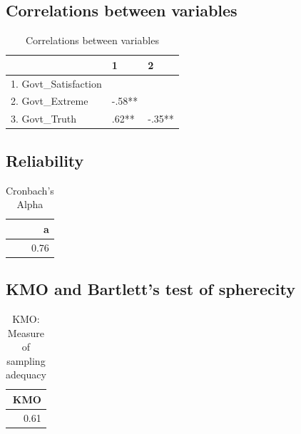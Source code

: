 \documentclass[]{article}
\begin{document}
\hypertarget{correlations-between-variables-6}{%
\subsection{Correlations between
variables}\label{correlations-between-variables-6}}

\begin{table}[H]

\caption{\label{tab:unnamed-chunk-32}Correlations between variables}
\centering
\fontsize{6}{8}\selectfont
\begin{tabular}[t]{lll}
\toprule
  & 1 & 2\\
\midrule
1. Govt\_Satisfaction &  & \\
2. Govt\_Extreme & -.58** & \\
3. Govt\_Truth & .62** & -.35**\\
\bottomrule
\end{tabular}
\end{table}

\hypertarget{reliability-5}{%
\subsection{Reliability}\label{reliability-5}}

\begin{table}[H]

\caption{\label{tab:unnamed-chunk-33}Cronbach's Alpha}
\centering
\fontsize{6}{8}\selectfont
\begin{tabular}[t]{r}
\toprule
a\\
\midrule
0.76\\
\bottomrule
\end{tabular}
\end{table}

\hypertarget{kmo-and-bartletts-test-of-spherecity-6}{%
\subsection{KMO and Bartlett's test of
spherecity}\label{kmo-and-bartletts-test-of-spherecity-6}}

\begin{table}[H]

\caption{\label{tab:unnamed-chunk-34}KMO: Measure of sampling adequacy}
\centering
\fontsize{6}{8}\selectfont
\begin{tabular}[t]{r}
\toprule
KMO\\
\midrule
0.61\\
\bottomrule
\end{tabular}
\end{table}
\end{document}
